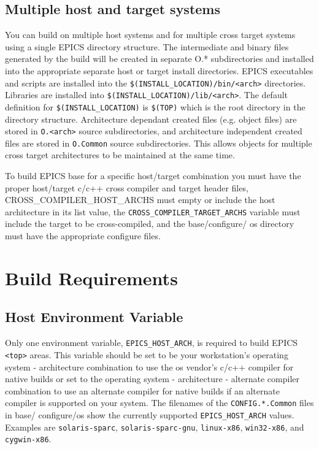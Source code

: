 \subsection{Multiple host and target systems}

You can build on multiple host systems and for multiple cross target systems using a single EPICS directory structure. 
The intermediate and binary files generated by the build will be created in separate O.* subdirectories and installed into 
the appropriate separate host or target install directories. EPICS executables and scripts are installed into the 
\verb|$(INSTALL_LOCATION)/bin/<arch>| directories. Libraries are installed into \verb|$(INSTALL_LOCATION)/lib/<arch>|. The 
default definition for \verb|$(INSTALL_LOCATION)| is \verb|$(TOP)| which is the root directory in the directory structure. 
Architecture dependant created files (e.g. object files) are stored in \verb|O.<arch>| source subdirectories, and architecture 
independent created files are stored in \verb|O.Common| source subdirectories. This allows objects for multiple cross target 
architectures to be maintained at the same time. 

To build EPICS base for a specific host/target combination you must have the proper host/target c/c++ cross compiler and 
target header files, CROSS\_COMPILER\_HOST\_ARCHS must empty or include the host architecture in its list value, the 
\verb|CROSS_COMPILER_TARGET_ARCHS| variable must include the target to be cross-compiled, and the base/configure/
os directory must have the appropriate configure files.

\section{Build Requirements}

\subsection{Host Environment Variable}

Only one environment variable, \verb|EPICS_HOST_ARCH|, is required to build EPICS \verb|<top>| areas. This variable should be 
set to be your workstation's operating system - architecture combination to use the os vendor's c/c++ compiler for native 
builds or set to the operating system - architecture - alternate compiler combination to use an alternate compiler for native 
builds if an alternate compiler is supported on your system. The filenames of the \verb|CONFIG.*.Common| files in base/
configure/os show the currently supported \verb|EPICS_HOST_ARCH| values. Examples are \verb|solaris-sparc|, \verb|solaris-sparc-gnu|, \verb|linux-x86|, \verb|win32-x86|, and \verb|cygwin-x86|. 

